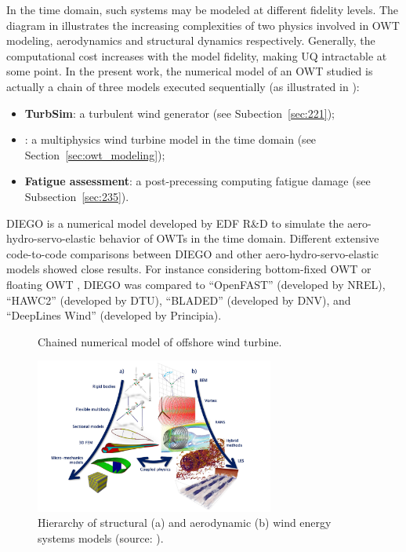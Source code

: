 In the time domain, such systems may be modeled at different fidelity levels. 
The diagram in  illustrates the increasing complexities of two physics involved in OWT modeling, aerodynamics and structural dynamics respectively. 
Generally, the computational cost increases with the model fidelity, making UQ intractable at some point. 
In the present work, the numerical model of an OWT studied is actually a chain of three models executed sequentially (as illustrated in ): 
\begin{itemize}
    \item \textbf{TurbSim}: a turbulent wind generator (see Subection~\ref{sec:221});
    \item \textbf{\footnotemark}: a multiphysics wind turbine model in the time domain (see Section~\ref{sec:owt_modeling}); 
    \item \textbf{Fatigue assessment}: a post-precessing computing fatigue damage (see Subsection~\ref{sec:235}). 
\end{itemize}
DIEGO is a numerical model developed by EDF R\&D to simulate the aero-hydro-servo-elastic behavior of OWTs in the time domain. 
Different extensive code-to-code comparisons between DIEGO and other aero-hydro-servo-elastic models showed close results. 
For instance considering bottom-fixed OWT \citep{popko_2021_DIEGO_benchmark} or floating OWT \citep{robertson_2020_diego_benchmark,kim_natarajan_2022}, DIEGO was compared to ``OpenFAST'' (developed by NREL), ``HAWC2'' (developed by DTU), ``BLADED'' (developed by DNV), and ``DeepLines Wind'' (developed by Principia). 


\begin{figure}[h]
    \centering
    
    \caption{Chained numerical model of offshore wind turbine.}
    \label{fig:owt_chained_model}
\end{figure}


\begin{figure}
    \centering
    \includegraphics[width=0.7\textwidth]{./part1/figures/OWT_modeling_fidelities.png}
    \caption{Hierarchy of structural (a) and aerodynamic (b) wind energy systems models (source: \citealp{veers_2019_review}).}
    \label{fig:owt_modeling_fidelities}
\end{figure}



